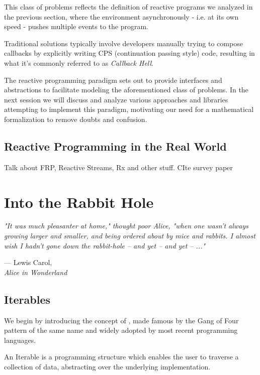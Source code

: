 This class of problems reflects the definition of reactive programs we analyzed in the previous section, where the environment asynchronously - i.e. at its own speed - pushes multiple events to the program. 

Traditional solutions typically involve developers manually trying to compose callbacks by explicitly writing CPS (continuation passing style) code\cite{meijer2015spicing}, resulting in what it's commonly referred to as \textit{Callback Hell}\cite{edwards2009coherent}.

The reactive programming paradigm sets out to provide interfaces and abstractions to facilitate modeling the aforementioned class of problems. In the next session we will discuss and analyze various approaches and libraries attempting to implement this paradigm, motivating our need for a mathematical formalization to remove doubts and confusion. 


\section{Reactive Programming in the Real World}

Talk about FRP, Reactive Streams, Rx and other stuff. CIte survey paper


\chapter{Into the Rabbit Hole}

\epigraph{\hspace{4ex}\textit{"It was much pleasanter at home," thought poor Alice, "when one wasn't always growing larger and smaller, and being ordered about by mice and rabbits. I almost wish I hadn't gone down the rabbit-hole -- and yet -- and yet -- ..."}}{--- Lewis Carol,\\ \textit{Alice in Wonderland}}

\section{Iterables}
\label{sec:iterables}


We begin by introducing the concept of , made famous by the Gang of Four pattern of the same name and widely adopted by most recent programming languages. 

An Iterable is a programming structure which enables the user to traverse a collection of data, abstracting over the underlying implementation.

